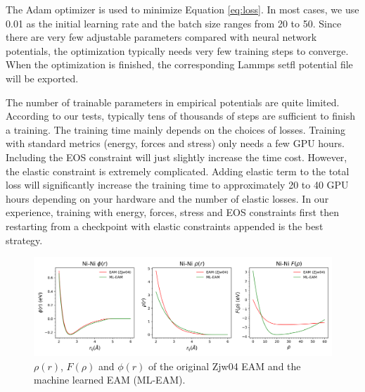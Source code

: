 \documentclass[final,3p,times]{elsarticle}
\begin{document}
The Adam optimizer \cite{adam} is used to minimize Equation \ref{eq:loss}. 
In most cases, we use 0.01 as the initial learning rate and the batch size 
ranges from 20 to 50. Since there are very few adjustable parameters compared 
with neural network potentials, the optimization typically needs very few 
training steps to converge. When the optimization is finished, the corresponding 
Lammps setfl potential file will be exported.

The number of trainable parameters in empirical potentials are quite limited. 
According to our tests, typically tens of thousands of steps are sufficient to 
finish a training. The training time mainly depends on the choices of losses. 
Training with standard metrics (energy, forces and stress) only needs a few GPU 
hours. Including the EOS constraint will just slightly increase the time cost.
However, the elastic constraint is extremely complicated. Adding elastic term 
to the total loss will significantly increase the training time to 
approximately 20 to 40 GPU hours depending on your hardware and the number of 
elastic losses. In our experience, training with energy, forces, stress and EOS 
constraints first then restarting from a checkpoint with elastic constraints 
appended is the best strategy.

% 
%
\begin{figure}
\centering
\includegraphics[scale=0.4]{Ni_eam.png}
\caption{\label{fig:Ni_eam} $\rho(r)$, $F(\rho)$ and $\phi(r)$ of the original 
Zjw04 EAM and the machine learned EAM (ML-EAM).}
\end{figure}
\end{document}
